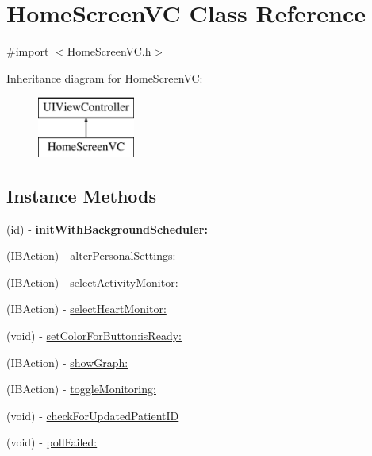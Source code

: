 \hypertarget{interface_home_screen_v_c}{\section{Home\-Screen\-V\-C Class Reference}
\label{interface_home_screen_v_c}
}


{\ttfamily \#import $<$Home\-Screen\-V\-C.\-h$>$}

Inheritance diagram for Home\-Screen\-V\-C\-:\begin{figure}[H]
\begin{center}
\leavevmode
\includegraphics[height=2.000000cm]{interface_home_screen_v_c}
\end{center}
\end{figure}
\subsection*{Instance Methods}
\begin{DoxyCompactItemize}
\item 
\hypertarget{interface_home_screen_v_c_aba4765dac13e0c3829c52a23d6c6b773}{(id) -\/ {\bfseries init\-With\-Background\-Scheduler\-:}}\label{interface_home_screen_v_c_aba4765dac13e0c3829c52a23d6c6b773}

\item 
(I\-B\-Action) -\/ \hyperlink{interface_home_screen_v_c_a8a98314cf71cd518e63b9ce589b35f02}{alter\-Personal\-Settings\-:}
\item 
(I\-B\-Action) -\/ \hyperlink{interface_home_screen_v_c_a3b9db379f6432201f499008c3918fa5f}{select\-Activity\-Monitor\-:}
\item 
(I\-B\-Action) -\/ \hyperlink{interface_home_screen_v_c_a9cf7d44e5fa97a7f70e116ba0b4c6b2c}{select\-Heart\-Monitor\-:}
\item 
(void) -\/ \hyperlink{interface_home_screen_v_c_ac0077075c9e48561794e5e6818232bd9}{set\-Color\-For\-Button\-:is\-Ready\-:}
\item 
(I\-B\-Action) -\/ \hyperlink{interface_home_screen_v_c_a50a2ea69f594741ce8926b4a8f6382f0}{show\-Graph\-:}
\item 
(I\-B\-Action) -\/ \hyperlink{interface_home_screen_v_c_a7cda2112b655ee8a7b622fbfa2ea0d0f}{toggle\-Monitoring\-:}
\item 
(void) -\/ \hyperlink{interface_home_screen_v_c_a83dbe8e2e8729282f47e1ffaf30b07f4}{check\-For\-Updated\-Patient\-I\-D}
\item 
(void) -\/ \hyperlink{interface_home_screen_v_c_a379c482616bb7911c6e9fc71cf9eb2a0}{poll\-Failed\-:}
\end{DoxyCompactItemize}
